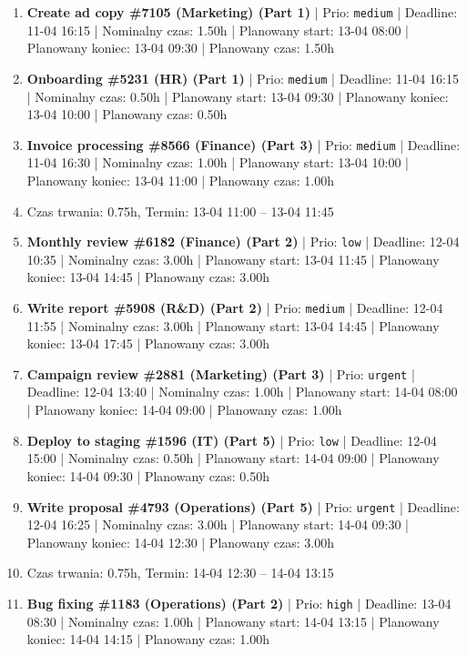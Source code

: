 {\begin{enumerate}
  \item [\textbf{14650}] \textbf{Create ad copy \#7105 (Marketing) (Part 1)} | Prio: \texttt{medium} | Deadline: 11-04 16:15 | Nominalny czas: 1.50h | Planowany start: 13-04 08:00 | Planowany koniec: 13-04 09:30 | Planowany czas: 1.50h
  \item [\textbf{14671}] \textbf{Onboarding \#5231 (HR) (Part 1)} | Prio: \texttt{medium} | Deadline: 11-04 16:15 | Nominalny czas: 0.50h | Planowany start: 13-04 09:30 | Planowany koniec: 13-04 10:00 | Planowany czas: 0.50h
  \item [\textbf{14675}] \textbf{Invoice processing \#8566 (Finance) (Part 3)} | Prio: \texttt{medium} | Deadline: 11-04 16:30 | Nominalny czas: 1.00h | Planowany start: 13-04 10:00 | Planowany koniec: 13-04 11:00 | Planowany czas: 1.00h
  \item [\textbf{PRZERWA}] Czas trwania: 0.75h, Termin: 13-04 11:00 -- 13-04 11:45
  \item [\textbf{14690}] \textbf{Monthly review \#6182 (Finance) (Part 2)} | Prio: \texttt{low} | Deadline: 12-04 10:35 | Nominalny czas: 3.00h | Planowany start: 13-04 11:45 | Planowany koniec: 13-04 14:45 | Planowany czas: 3.00h
  \item [\textbf{14674}] \textbf{Write report \#5908 (R\&D) (Part 2)} | Prio: \texttt{medium} | Deadline: 12-04 11:55 | Nominalny czas: 3.00h | Planowany start: 13-04 14:45 | Planowany koniec: 13-04 17:45 | Planowany czas: 3.00h
  \item [\textbf{14599}] \textbf{Campaign review \#2881 (Marketing) (Part 3)} | Prio: \texttt{urgent} | Deadline: 12-04 13:40 | Nominalny czas: 1.00h | Planowany start: 14-04 08:00 | Planowany koniec: 14-04 09:00 | Planowany czas: 1.00h
  \item [\textbf{14692}] \textbf{Deploy to staging \#1596 (IT) (Part 5)} | Prio: \texttt{low} | Deadline: 12-04 15:00 | Nominalny czas: 0.50h | Planowany start: 14-04 09:00 | Planowany koniec: 14-04 09:30 | Planowany czas: 0.50h
  \item [\textbf{14600}] \textbf{Write proposal \#4793 (Operations) (Part 5)} | Prio: \texttt{urgent} | Deadline: 12-04 16:25 | Nominalny czas: 3.00h | Planowany start: 14-04 09:30 | Planowany koniec: 14-04 12:30 | Planowany czas: 3.00h
  \item [\textbf{PRZERWA}] Czas trwania: 0.75h, Termin: 14-04 12:30 -- 14-04 13:15
  \item [\textbf{14613}] \textbf{Bug fixing \#1183 (Operations) (Part 2)} | Prio: \texttt{high} | Deadline: 13-04 08:30 | Nominalny czas: 1.00h | Planowany start: 14-04 13:15 | Planowany koniec: 14-04 14:15 | Planowany czas: 1.00h

\end{enumerate}}
